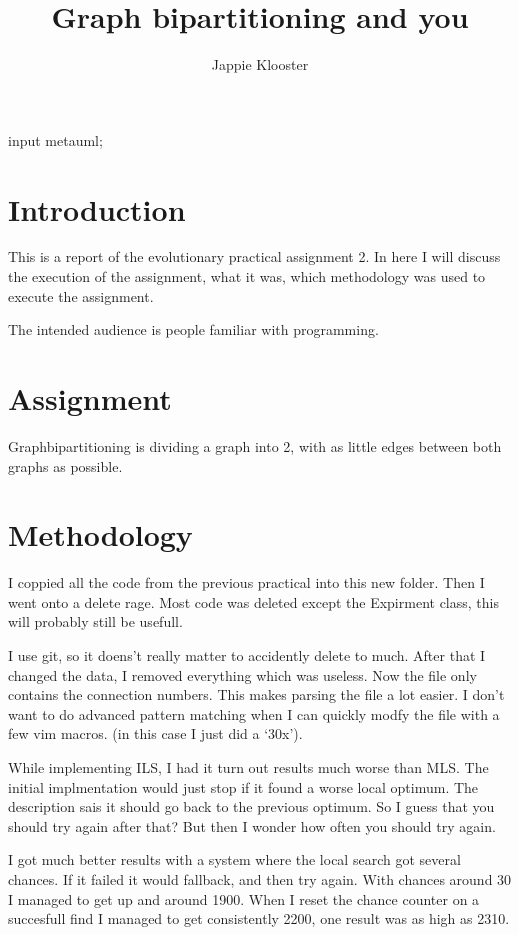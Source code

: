 \documentclass{article}
\begin{document}
\begin{empfile}
\begin{empcmds}
input metauml;
\end{empcmds}
\author{Jappie Klooster}
\title{Graph bipartitioning and you}
\maketitle

\section{Introduction}
This is a report of the evolutionary practical assignment 2.
In here I will discuss the execution of the assignment, what it was, which
methodology was used to execute the assignment.

The intended audience is people familiar with programming.

\section{Assignment}
Graphbipartitioning is dividing a graph into 2, with as little edges between
both graphs as possible.

\section{Methodology}
I coppied all the code from the previous practical into this new folder.
Then I went onto a delete rage. Most code was deleted except the Expirment
class, this will probably still be usefull.

I use git, so it doens't really matter to accidently delete to much. After
that I changed the data, I removed everything which was useless. Now the file
only contains the connection numbers. This makes parsing the file a lot
easier. I don't want to do advanced pattern matching when I can quickly modfy
the file with a few vim macros. (in this case I just did a `30x').

While implementing ILS, I had it turn out results much worse than MLS.
The initial implmentation would just stop if it found a worse local optimum.
The description sais it should go back to the previous optimum. So I guess
that you should try again after that? But then I wonder how often you should
try again.

I got much better results with a system where the local search got several chances.
If it failed it would fallback, and then try again. 
With chances around 30 I managed to get up and around 1900.
When I reset the chance counter on a succesfull find
I managed to get consistently 2200, one result was as high as 2310.


\end{empfile}
\end{document}

